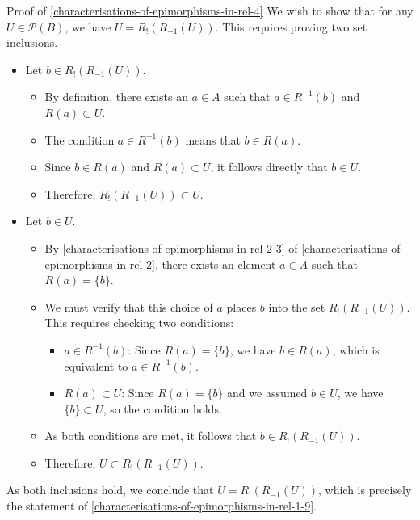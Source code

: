 \begin{Proof}{Proof of \cref{characterisations-of-epimorphisms-in-rel-4}}
    We wish to show that for any $U\in\mathcal{P}(B)$, we have $U = R_{!}(R_{-1}(U))$. This requires proving two set inclusions.
    \begin{itemize}
        \item{}Let $b\in R_{!}(R_{-1}(U))$.
            \begin{itemize}
                \item By definition, there exists an $a\in A$ such that $a\in R^{-1}(b)$ and $R(a)\subset U$.
                \item The condition $a\in R^{-1}(b)$ means that $b\in R(a)$.
                \item Since $b\in R(a)$ and $R(a)\subset U$, it follows directly that $b\in U$.
                \item Therefore, $R_{!}(R_{-1}(U))\subset U$.
            \end{itemize}
        \item{}Let $b \in U$.
            \begin{itemize}
                \item By \cref{characterisations-of-epimorphisms-in-rel-2-3} of \cref{characterisations-of-epimorphisms-in-rel-2}, there exists an element $a\in A$ such that $R(a)=\{b\}$.
                \item We must verify that this choice of $a$ places $b$ into the set $R_{!}(R_{-1}(U))$. This requires checking two conditions:
                    \begin{itemize}
                        \item $a\in R^{-1}(b)$: Since $R(a)=\{b\}$, we have $b\in R(a)$, which is equivalent to $a\in R^{-1}(b)$.
                        \item $R(a)\subset U$:  Since $R(a)=\{b\}$ and we assumed $b\in U$, we have $\{b\}\subset U$, so the condition holds.
                    \end{itemize}
                \item As both conditions are met, it follows that $b\in R_{!}(R_{-1}(U))$.
                \item Therefore, $U\subset R_{!}(R_{-1}(U))$.
            \end{itemize}
    \end{itemize}
    As both inclusions hold, we conclude that $U=R_{!}(R_{-1}(U))$, which is precisely the statement of \cref{characterisations-of-epimorphisms-in-rel-1-9}.
\end{Proof}
